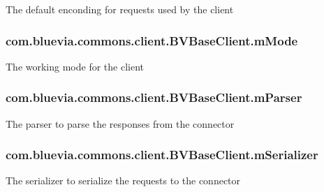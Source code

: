\label{classcom_1_1bluevia_1_1commons_1_1client_1_1BVBaseClient_a8498a310d0ac85b785d08b9e4a4a2fd3}
The default enconding for requests used by the client \hypertarget{classcom_1_1bluevia_1_1commons_1_1client_1_1BVBaseClient_ac5317f34c5d1db5bdd74ac1351db1f7e}{
\subsubsection[{mMode}]{ {\bf com.bluevia.commons.client.BVBaseClient.mMode}}}
\label{classcom_1_1bluevia_1_1commons_1_1client_1_1BVBaseClient_ac5317f34c5d1db5bdd74ac1351db1f7e}
The working mode for the client \hypertarget{classcom_1_1bluevia_1_1commons_1_1client_1_1BVBaseClient_a8a0cf4418292e19e112fadd545eb6845}{
\subsubsection[{mParser}]{ {\bf com.bluevia.commons.client.BVBaseClient.mParser}}}
\label{classcom_1_1bluevia_1_1commons_1_1client_1_1BVBaseClient_a8a0cf4418292e19e112fadd545eb6845}
The parser to parse the responses from the connector \hypertarget{classcom_1_1bluevia_1_1commons_1_1client_1_1BVBaseClient_aed01ee968cac635b250b9c3dece84648}{
\subsubsection[{mSerializer}]{ {\bf com.bluevia.commons.client.BVBaseClient.mSerializer}}}
\label{classcom_1_1bluevia_1_1commons_1_1client_1_1BVBaseClient_aed01ee968cac635b250b9c3dece84648}
The serializer to serialize the requests to the connector 